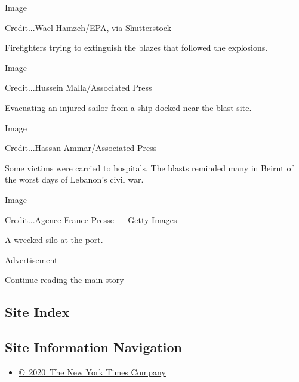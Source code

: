 Image

Credit...Wael Hamzeh/EPA, via Shutterstock

Firefighters trying to extinguish the blazes that followed the
explosions.

Image

Credit...Hussein Malla/Associated Press

Evacuating an injured sailor from a ship docked near the blast site.

Image

Credit...Hassan Ammar/Associated Press

Some victims were carried to hospitals. The blasts reminded many in
Beirut of the worst days of Lebanon's civil war.

Image

Credit...Agence France-Presse --- Getty Images

A wrecked silo at the port.

Advertisement

\protect\hyperlink{after-bottom}{Continue reading the main story}

\hypertarget{site-index}{%
\subsection{Site Index}\label{site-index}}

\hypertarget{site-information-navigation}{%
\subsection{Site Information
Navigation}\label{site-information-navigation}}

\begin{itemize}
\tightlist
\item
  \href{https://help.nytimes.com/hc/en-us/articles/115014792127-Copyright-notice}{©~2020~The
  New York Times Company}
\end{itemize}

